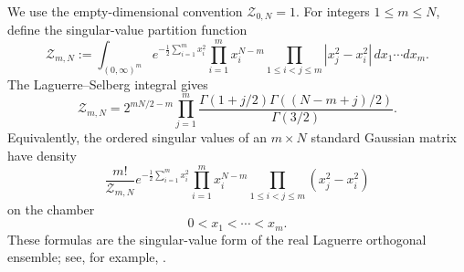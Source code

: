 \documentclass[11pt]{article}
\newcommand{\1}{\mathbf 1}
\begin{document}
We use the empty-dimensional convention \(\mathcal Z_{0,N}=1\).
For integers \(1\le m\le N\), define the singular-value partition function
\begin{equation}
        \mathcal Z_{m,N}
        :=
        \int_{(0,\infty)^m}
        e^{-\frac12\sum_{i=1}^m x_i^2}
        \prod_{i=1}^m x_i^{N-m}
        \prod_{1\le i<j\le m}|x_j^2-x_i^2|
        \,dx_1\cdots dx_m.
        \label{eq:singular-value-partition-function}
\end{equation}
The Laguerre--Selberg integral gives
\begin{equation}
        \mathcal Z_{m,N}
        =
        2^{mN/2-m}
        \prod_{j=1}^m
        \frac{
        \Gamma(1+j/2)
        \Gamma((N-m+j)/2)
        }{
        \Gamma(3/2)
        }.
        \label{eq:singular-value-partition-evaluation}
\end{equation}
Equivalently, the ordered singular values of an \(m\times N\) standard Gaussian matrix
have density
\begin{equation}
        \frac{m!}{\mathcal Z_{m,N}}
        e^{-\frac12\sum_{i=1}^m x_i^2}
        \prod_{i=1}^m x_i^{N-m}
        \prod_{1\le i<j\le m}(x_j^2-x_i^2)
        \label{eq:ordered-singular-value-density}
\end{equation}
on the chamber
\[
        0<x_1<\cdots<x_m.
\]
These formulas are the singular-value form of the real Laguerre orthogonal ensemble; see,
for example, \cite{Edelman1988,TaoVu2010}.
\end{document}
